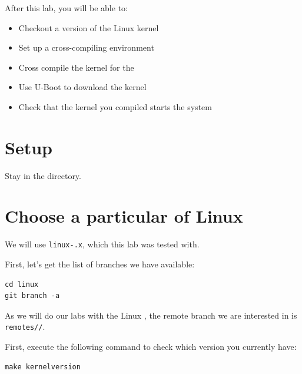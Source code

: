 
After this lab, you will be able to:
\begin{itemize}
\item Checkout a  version of the Linux kernel
\item Set up a cross-compiling environment
\item Cross compile the kernel for the \labboarddescription
\item Use U-Boot to download the kernel
\item Check that the kernel you compiled starts the system
\end{itemize}

\section{Setup}

Stay in the  directory.

\section{Choose a particular  of Linux}

We will use \texttt{linux-\workingkernel.x},
which this lab was tested with.

First, let's get the list of branches we have available:

\begin{verbatim}
cd linux
git branch -a
\end{verbatim}

As we will do our labs with the Linux \workingkernel,
the remote branch we are interested in is\\%
\texttt{remotes//}.

First, execute the following command to check which version you
currently have:

\begin{verbatim}
make kernelversion
\end{verbatim}

